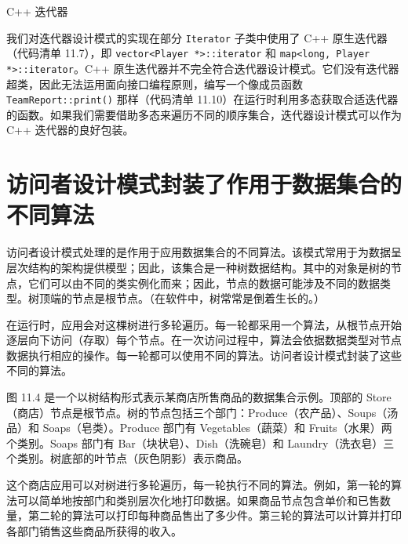 \begin{mySidebar}{C++ 迭代器}

我们对迭代器设计模式的实现在部分 \texttt{Iterator} 子类中使用了 C++ 原生迭代器（代码清单 11.7），即 \texttt{vector<Player *>::\allowbreak{}iterator} 和 \texttt{map<long,\allowbreak{} Player *>::\allowbreak{}iterator}。C++ 原生迭代器并不完全符合迭代器设计模式。它们没有迭代器超类，因此无法运用面向接口编程原则，编写一个像成员函数 \texttt{Team\allowbreak{}Report::\allowbreak{}print(\allowbreak{})\allowbreak{}} 那样（代码清单 11.10）在运行时利用多态获取合适迭代器的函数。如果我们需要借助多态来遍历不同的顺序集合，迭代器设计模式可以作为 C++ 迭代器的良好包装。
\end{mySidebar}

\section{访问者设计模式封装了作用于数据集合的不同算法}

访问者设计模式处理的是作用于应用数据集合的不同算法。该模式常用于为数据呈层次结构的架构提供模型；因此，该集合是一种树数据结构。其中的对象是树的节点，它们可以由不同的类实例化而来；因此，节点的数据可能涉及不同的数据类型。树顶端的节点是根节点。（在软件中，树常常是倒着生长的。）

在运行时，应用会对这棵树进行多轮遍历。每一轮都采用一个算法，从根节点开始逐层向下访问（存取）每个节点。在一次访问过程中，算法会依据数据类型对节点数据执行相应的操作。每一轮都可以使用不同的算法。访问者设计模式封装了这些不同的算法。


图 11.4 是一个以树结构形式表示某商店所售商品的数据集合示例。顶部的 Store（商店）节点是根节点。树的节点包括三个部门：Produce（农产品）、Soups（汤品）和 Soaps（皂类）。Produce 部门有 Vegetables（蔬菜）和 Fruits（水果）两个类别。Soaps 部门有 Bar（块状皂）、Dish（洗碗皂）和 Laundry（洗衣皂）三个类别。树底部的叶节点（灰色阴影）表示商品。


这个商店应用可以对树进行多轮遍历，每一轮执行不同的算法。例如，第一轮的算法可以简单地按部门和类别层次化地打印数据。如果商品节点包含单价和已售数量，第二轮的算法可以打印每种商品售出了多少件。第三轮的算法可以计算并打印各部门销售这些商品所获得的收入。

